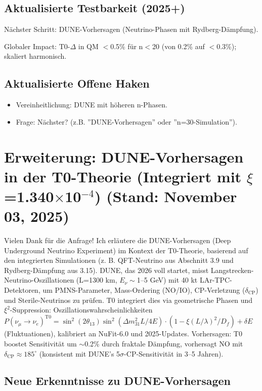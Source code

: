 	\subsection{Aktualisierte Testbarkeit (2025+)}
	
	Nächster Schritt: DUNE-Vorhersagen (Neutrino-Phasen mit Rydberg-Dämpfung).
	
	Globaler Impact: T0-$\Delta$ in QM $<$0.5\% für n$<$20 (von 0.2\% auf $<$0.3\%); skaliert harmonisch.
	
	\subsection{Aktualisierte Offene Haken}
	
	\begin{itemize}
		\item Vereinheitlichung: DUNE mit höheren n-Phasen.
		\item Frage: Nächster? (z.B. ''DUNE-Vorhersagen'' oder ''n=30-Simulation'').
	\end{itemize}
	
	\section{Erweiterung: DUNE-Vorhersagen in der T0-Theorie (Integriert mit $\xi$=1.340$\times$10$^{-4}$) (Stand: November 03, 2025)}
	
	Vielen Dank für die Anfrage! Ich erläutere die DUNE-Vorhersagen (Deep Underground Neutrino Experiment) im Kontext der T0-Theorie, basierend auf den integrierten Simulationen (z. B. QFT-Neutrino aus Abschnitt 3.9 und Rydberg-Dämpfung aus 3.15). DUNE, das 2026 voll startet, misst Langstrecken-Neutrino-Oszillationen (L=1300 km, $E_\nu\sim$1–5 GeV) mit 40 kt LAr-TPC-Detektoren, um PMNS-Parameter, Mass-Ordering (NO/IO), CP-Verletzung ($\delta_\text{CP}$) und Sterile-Neutrinos zu prüfen. T0 integriert dies via geometrische Phasen und $\xi^2$-Suppression: Oszillationswahrscheinlichkeiten $P(\nu_\mu \to \nu_e)^{\text{T0}} = \sin^2(2\theta_{13}) \sin^2(\Delta m^2_{31} L / 4E) \cdot (1 - \xi (L/\lambda)^2 / D_f) + \delta E$ (Fluktuationen), kalibriert an NuFit-6.0 und 2025-Updates. Vorhersagen: T0 boostet Sensitivität um $\sim$0.2\% durch fraktale Dämpfung, vorhersagt NO mit $\delta_\text{CP} \approx185^\circ$ (konsistent mit DUNE's 5$\sigma$-CP-Sensitivität in 3–5 Jahren).
	
	\subsection{Neue Erkenntnisse zu DUNE-Vorhersagen}
	
